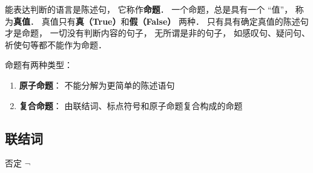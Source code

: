 
\begin{definition}{}
能表达判断的语言是陈述句， 它称作\textbf{命题}． 一个命题，总是具有一个 “值”， 称为\textbf{真值}． 真值只有\textbf{真（True）}和\textbf{假（False）} 两种． 只有具有确定真值的陈述句才是命题， 一切没有判断内容的句子， 无所谓是非的句子， 如感叹句、疑问句、祈使句等都不能作为命题．
\end{definition}

命题有两种类型：
\begin{enumerate}
\item \textbf{原子命题}： 不能分解为更简单的陈述语句
\item \textbf{复合命题}： 由联结词、标点符号和原子命题复合构成的命题
\end{enumerate} 

\subsection{联结词}
\begin{definition}{否定 $\neg$} \end{definition} 
